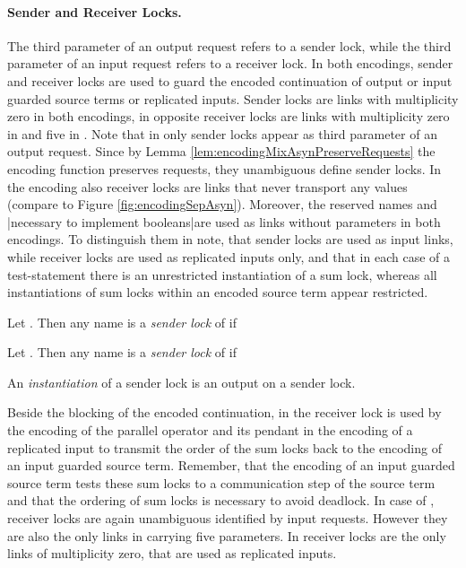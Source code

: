 \documentclass[]{llncs}
\begin{document}
\paragraph*{Sender and Receiver Locks.} The third parameter of an output request refers to a sender lock, while the third parameter of an input request refers to a receiver lock. In both encodings, sender and receiver locks are used to guard the encoded continuation of output or input guarded source terms or replicated inputs. Sender locks are links with multiplicity zero in both encodings, in opposite receiver locks are links with multiplicity zero in  and five in . Note that in  only sender locks appear as third parameter of an output request. Since by Lemma \ref{lem:encodingMixAsynPreserveRequests} the encoding function  preserves requests, they unambiguous define sender locks. In the encoding  also receiver locks are links that never transport any values (compare to Figure \ref{fig:encodingSepAsyn}). Moreover, the reserved names  and |necessary to implement booleans|are used as links without parameters in both encodings. To distinguish them in  note, that sender locks are used as input links, while receiver locks are used as replicated inputs only, and that in each case of a test-statement there is an unrestricted instantiation of a sum lock, whereas all instantiations of sum locks within an encoded source term appear restricted.

\begin{definition} \label{def:senderLock}
	Let . Then any name  is a \emph{sender lock} of  if
	
	Let . Then any name  is a \emph{sender lock} of  if
	
	An \emph{instantiation} of a sender lock is an output on a sender lock.
\end{definition}

Beside the blocking of the encoded continuation, in  the receiver lock is used by the encoding of the parallel operator and its pendant in the encoding of a replicated input to transmit the order of the sum locks back to the encoding of an input guarded source term. Remember, that the encoding of an input guarded source term tests these sum locks to \simulate a communication step of the source term and that the ordering of sum locks is necessary to avoid deadlock. In case of , receiver locks are again unambiguous identified by input requests. However they are also the only links in  carrying five parameters. In  receiver locks are the only links of multiplicity zero, that are used as replicated inputs.
\end{document}
